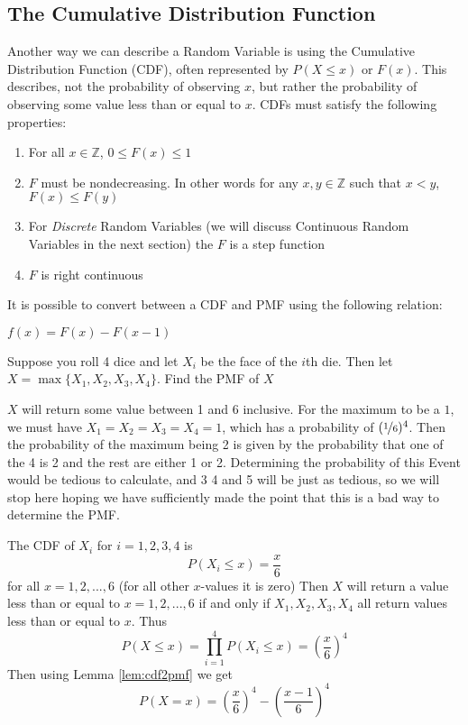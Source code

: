 \documentclass{report}
\begin{document}
\subsection{The Cumulative Distribution Function}
Another way we can describe a Random Variable is using the Cumulative Distribution Function (CDF), often represented by $P(X\le x)$ or $F(x)$. This describes, not the probability of observing $x$, but rather the probability of observing some value less than or equal to $x$. CDFs must satisfy the following properties:
\begin{enumerate}
    \item For all $x\in\mathbb Z$, $0\le F(x) \le 1$
    \item $F$ must be nondecreasing. In other words for any $x,y\in\mathbb Z$ such that $x<y$, $F(x)\le F(y)$
    \item For \emph{Discrete} Random Variables (we will discuss Continuous Random Variables in the next section) the $F$ is a step function
    \item $F$ is right continuous
\end{enumerate}
\label{cdf_axioms}
It is possible to convert between a CDF and PMF using the following relation:
\begin{lemma}
    $f(x)=F(x)-F(x-1)$
\end{lemma}\label{lem:cdf2pmf}


\begin{example}
    Suppose you roll 4 dice and let $X_i$ be the face of the $i$th die. Then let $X=\max\{X_1, X_2, X_3, X_4\}$. Find the PMF of $X$

    $X$ will return some value between 1 and 6 inclusive. For the maximum to be a $1$, we must have $X_1=X_2=X_3=X_4=1$, which has a probability of $(\nicefrac 1 6)^4$. Then the probability of the maximum being 2 is given by the probability that one of the 4 is 2 and the rest are either 1 or 2. Determining the probability of this Event would be tedious to calculate, and 3 4 and 5 will be just as tedious, so we will stop here hoping we have sufficiently made the point that this is a bad way to determine the PMF.
    
    The CDF of $X_i$ for $i=1,2,3,4$ is
    \[
        P(X_i\le x)=\frac x 6
    \]
    for all $x=1,2,...,6$ (for all other $x$-values it is zero) Then $X$ will return a value less than or equal to $x=1,2,...,6$ if and only if $X_1, X_2,X_3,X_4$ all return values less than or equal to $x$. Thus
    \[
        P(X\le x)=\prod_{i=1}^4 P(X_i\le x)=\left(\frac x 6\right)^4
    \]
    Then using Lemma \ref{lem:cdf2pmf} we get
    \[
        P(X=x)= \left(\frac x 6\right)^4-\left(\frac {x-1} 6\right)^4
    \]
\end{example}
\end{document}

